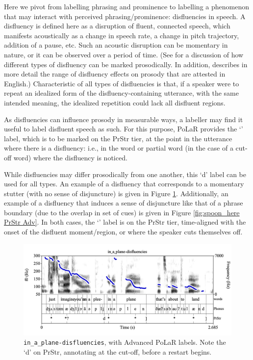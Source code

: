 \documentclass[11pt, twoside]{memoir}
\def\textlabel#1{{\relsize{-.5}\fontspec[Mapping=tex-text]{Roboto Mono}{#1}}}
\begin{document}
Here we pivot from labelling phrasing and prominence to labelling a phenomenon that may interact with perceived phrasing\slash prominence: disfluencies in speech. A disfluency is defined here as a disruption of fluent, connected speech, which manifests acoustically as a change in speech rate, a change in pitch trajectory, addition of a pause, etc. Such an acoustic disruption can be momentary in nature, or it can be observed over a period of time. (See \citealt{shattuck-hufnagelcutler99} for a discussion of how different types of disfluency can be marked prosodically. In addition, \citealt{brugos-19} describes in more detail the range of disfluency effects on prosody that are attested in English.) Characteristic of all types of disfluencies is that, if a speaker were to repeat an idealized form of the disfluency-containing utterance, with the same intended meaning, the idealized repetition could lack all disfluent regions.

As disfluencies can influence prosody in measurable ways, a labeller may find it useful to label disfluent speech as such. For this purpose, PoLaR provides the ‘\textlabel{d}’ label, which is to be marked on the PrStr tier, at the point in the utterance where there is a disfluency: i.e., in the word or partial word (in the case of a cut-off word) where the disfluency is noticed.

While disfluencies may differ prosodically from one another, this ‘d’ label can be used for all types. An example of a disfluency that corresponds to a momentary stutter (with no sense of disjuncture) is given in Figure \ref{fig:in_a_plane-disfluencies PrStr Adv}. Additionally, an example of a disfluency that induces a sense of disjuncture like that of a phrase boundary (due to the overlap in set of cues) is given in Figure \ref{fig:spoon_here PrStr Adv}. In both cases, the ‘\textlabel{d}’ label is on the PrStr tier, time-aligned with the onset of the disfluent moment\slash region, or where the speaker cuts themselves off.

\begin{figure}[H]
\centering
%
\includegraphics[width=.875\linewidth]{PrStr-in_a_plane-disfluencies-adv.png}
%
\caption[\texttt{in\_a\_plane-disfluencies}, with Advanced PoLaR labels.]{\texttt{in\_a\_plane-disfluencies}, with Advanced PoLaR labels. Note the ‘d’ on PrStr, annotating at the cut-off, before a restart begins.%
\label{fig:in_a_plane-disfluencies PrStr Adv}%
}
\end{figure}
\end{document}
